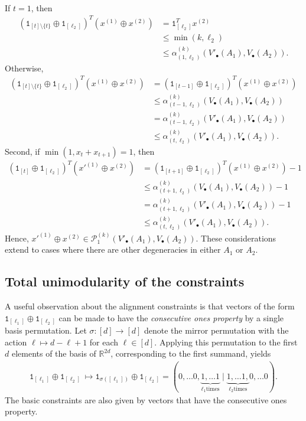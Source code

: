 \documentclass[12pt]{article}
\theoremstyle{definition}
\numberwithin{equation}{section}
\numberwithin{equation}{section}
\newcommand{\al}{\alpha}
\newcommand{\one}{\mathtt{1}}
\newcommand{\cP}{\mathcal{P}}
\newcommand{\bR}{\mathbb{R}}
\begin{document}
\begin{enumerate}
\begin{align}
    \end{align}
    If \(t = 1\), then 
    \begin{align}
    (\one_{[t]\setminus\{t\}} \oplus \one_{[\ell_2]})^T (x^{(1)} \oplus x^{(2)}) &= \one_{[\ell_2]}^T x^{(2)} \\
    &\leq \min(k, \ell_2) \\
    &\leq \al_{(1, \ell_2)}^{(k)} (V'_\bullet (A_1), V_\bullet(A_2)).
    \end{align}
    Otherwise, 
    \begin{align}
    (\one_{[t]\setminus\{t\}} \oplus \one_{[\ell_2]})^T (x^{(1)} \oplus x^{(2)}) &= (\one_{[t-1]} \oplus \one_{[\ell_2]})^T (x^{(1)} \oplus x^{(2)}) \\
    &\leq \al_{(t-1, \ell_2)}^{(k)} (V_\bullet (A_1), V_\bullet(A_2))\\
    &= \al_{(t-1, \ell_2)}^{(k)} (V'_\bullet (A_1), V_\bullet(A_2)) \\
    &\leq \al_{(t, \ell_2)}^{(k)} (V'_\bullet (A_1), V_\bullet(A_2)).
    \end{align}
Second, if \(\min(1,x_t + x_{t+1}) = 1\), then 
    \begin{align}
    (\one_{[t]} \oplus \one_{[\ell_2]})^T (x'^{(1)} \oplus x^{(2)}) &= (\one_{[t+1]} \oplus \one_{[\ell_2]})^T (x^{(1)} \oplus x^{(2)}) - 1 \\
    &\leq \al_{(t+1, \ell_2)}^{(k)} (V_\bullet (A_1), V_\bullet(A_2)) - 1 \\
    &= \al_{(t+1, \ell_2)}^{(k)} (V'_\bullet (A_1), V_\bullet(A_2)) - 1\\
    &\leq \al_{(t, \ell_2)}^{(k)} (V'_\bullet (A_1), V_\bullet(A_2)).
    \end{align}
    Hence, \(x'^{(1)} \oplus x^{(2)} \in \cP_1^{(k)} (V'_\bullet(A_1), V_\bullet(A_2))\). These considerations extend to cases where there are other degeneracies in either \(A_1\) or \(A_2\). 
\end{enumerate}




\subsection{Total unimodularity of the constraints}
\label{subsec: TU}
A useful observation about the alignment constraints is that vectors of the form \(\one_{[\ell_1]} \oplus \one_{[\ell_2]}\) can be made to have the \textit{consecutive ones property} by a single basis permutation. Let \(\sigma: [d] \rightarrow [d]\) denote the mirror permutation with the action \(\ell \mapsto d - \ell + 1\) for each \(\ell \in [d]\). Applying this permutation to the first \(d\) elements of the basis of \(\bR^{2d}\), corresponding to the first summand, yields 
\begin{align}
  \one_{[\ell_1]} \oplus \one_{[\ell_2]}\ \mapsto \one_{\sigma([\ell_1])} \oplus \one_{[\ell_2]} = (0, \ldots 0, \underbrace{1, \ldots 1}_{\ell_1 \text{times}} \mid \underbrace{1, \ldots 1,}_{\ell_2 \text{times}} 0, \ldots 0).  
\end{align}
The basic constraints are also given by vectors that have the consecutive ones property.
\end{document}
